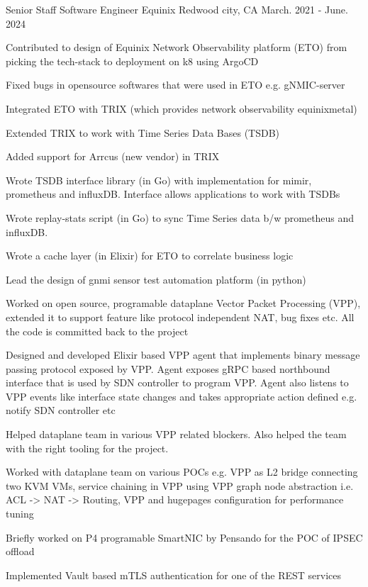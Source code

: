 \begin{cventries}
{\begin{cvitems}
{\begin{itemize}
          \end{itemize}
        }
      \end{cvitems}
    }
  \cventry
    {Senior Staff Software Engineer} %
    {Equinix} %
    {Redwood city, CA} %
    {March. 2021 - June. 2024} %
    {
      \begin{cvitems} %
        \item {Contributed to design of Equinix Network Observability platform (ETO) from picking the tech-stack to deployment on k8 using ArgoCD}
        \item {Fixed bugs in opensource softwares that were used in ETO e.g. gNMIC-server}
        \item {Integrated ETO with TRIX (which provides network observability equinixmetal)}
        \item {Extended TRIX to work with Time Series Data Bases (TSDB)}
        \item {Added support for Arrcus (new vendor) in TRIX}
        \item {Wrote TSDB interface library (in Go) with implementation for mimir, prometheus and influxDB. Interface allows applications to work with TSDBs}
        \item {Wrote replay-stats script (in Go) to sync Time Series data b/w prometheus and influxDB.}
        \item {Wrote a cache layer (in Elixir) for ETO to correlate business logic}
        \item {Lead the design of gnmi sensor test automation platform (in python)}
        \item {Worked on open source, programable dataplane Vector Packet Processing (VPP), extended it to support feature like protocol independent NAT, bug fixes etc.
               All the code is committed back to the project}
        \item {Designed and developed Elixir based VPP agent that implements binary message passing protocol exposed by VPP.
               Agent exposes gRPC based northbound interface that is used by SDN controller to program VPP. Agent also listens to VPP events like interface state changes and
               takes appropriate action defined e.g. notify SDN controller etc}
        \item {Helped dataplane team in various VPP related blockers. Also helped the team with the right tooling for the project.}
        \item {Worked with dataplane team on various POCs e.g. VPP as L2 bridge connecting two KVM VMs, service chaining in VPP using VPP graph node abstraction i.e. ACL -> NAT -> Routing,
               VPP and hugepages configuration for performance tuning}
        \item {Briefly worked on P4 programable SmartNIC by Pensando for the POC of IPSEC offload}
        \item {Implemented Vault based mTLS authentication for one of the REST services}
      \end{cvitems}
    }


\end{cventries}

